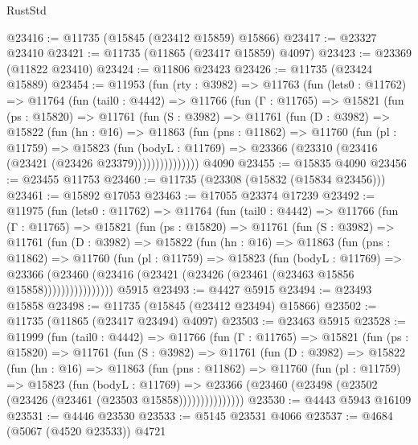 \begin{lexlean}{RustStd}
\begin{coremodule}
@23416 := @11735 (@15845 (@23412 @15859) @15866)
@23417 := @23327 @23410
@23421 := @11735 (@11865 (@23417 @15859) @4097)
@23423 := @23369 (@11822 @23410)
@23424 := @11806 @23423
@23426 := @11735 (@23424 @15889)
@23454 := @11953
    (fun (rty : @3982) =>
    @11763
      (fun (lets0 : @11762) =>
      @11764
        (fun (tail0 : @4442) =>
        @11766
          (fun (Γ : @11765) =>
          @15821
            (fun (ps : @15820) =>
            @11761
              (fun (S : @3982) =>
              @11761
                (fun (D : @3982) =>
                @15822
                  (fun (hn : @16) =>
                  @11863
                    (fun (pns : @11862) =>
                    @11760
                      (fun (pl : @11759) =>
                      @15823
                        (fun (bodyL : @11769) =>
                        @23366 (@23310 (@23416 (@23421 (@23426 @23379)))))))))))))))
    @4090
@23455 := @15835 @4090
@23456 := @23455 @11753
@23460 := @11735 (@23308 (@15832 (@15834 @23456)))
@23461 := @15892 @17053
@23463 := @17055 @23374 @17239
@23492 := @11975
    (fun (lets0 : @11762) =>
    @11764
      (fun (tail0 : @4442) =>
      @11766
        (fun (Γ : @11765) =>
        @15821
          (fun (ps : @15820) =>
          @11761
            (fun (S : @3982) =>
            @11761
              (fun (D : @3982) =>
              @15822
                (fun (hn : @16) =>
                @11863
                  (fun (pns : @11862) =>
                  @11760
                    (fun (pl : @11759) =>
                    @15823
                      (fun (bodyL : @11769) =>
                      @23366
                        (@23460
                          (@23416 (@23421 (@23426 (@23461 (@23463 @15856 @15858))))))))))))))))
    @5915
@23493 := @4427 @5915
@23494 := @23493 @15858
@23498 := @11735 (@15845 (@23412 @23494) @15866)
@23502 := @11735 (@11865 (@23417 @23494) @4097)
@23503 := @23463 @5915
@23528 := @11999
    (fun (tail0 : @4442) =>
    @11766
      (fun (Γ : @11765) =>
      @15821
        (fun (ps : @15820) =>
        @11761
          (fun (S : @3982) =>
          @11761
            (fun (D : @3982) =>
            @15822
              (fun (hn : @16) =>
              @11863
                (fun (pns : @11862) =>
                @11760
                  (fun (pl : @11759) =>
                  @15823
                    (fun (bodyL : @11769) =>
                    @23366 (@23460 (@23498 (@23502 (@23426 (@23461 (@23503 @15858)))))))))))))))
@23530 := @4443 @5943 @16109
@23531 := @4446 @23530
@23533 := @5145 @23531 @4066
@23537 := @4684 (@5067 (@4520 @23533)) @4721

\end{coremodule}
\end{lexlean}
